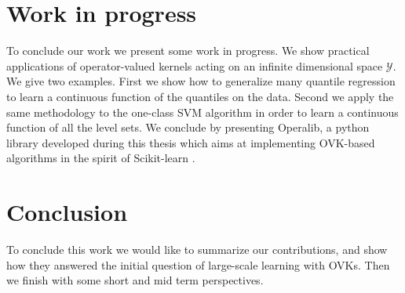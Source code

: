 
\chapter{Work in progress}
\label{ch:Perspectives}
\bigskip
\begin{justify}
    To conclude our work we present some work in progress. We show practical
    applications of operator-valued kernels acting on an infinite dimensional
    space $\mathcal{Y}$. We give two examples. First we show how to generalize
    many quantile regression to learn a continuous function of the quantiles on
    the data. Second we apply the same methodology to the one-class SVM
    algorithm in order to learn a continuous function of all the level sets. We
    conclude by presenting Operalib, a python library developed during this
    thesis which aims at implementing \acs{OVK}-based algorithms in the spirit
    of Scikit-learn \citep{pedregosa2011scikit}.
\end{justify}
\minitoc




\chapter{Conclusion}
\bigskip
\begin{justify}
    To conclude this work we would like to summarize our contributions, and
    show how they answered the initial question of large-scale learning with
    \aclp{OVK}. Then we finish with some short and mid term perspectives.
\end{justify}
\minitoc
\label{ch:conclusion}

